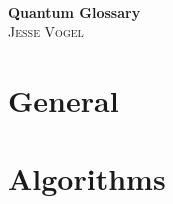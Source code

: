 \documentclass[10pt]{report}
\begin{document}
\thispagestyle{empty}

\begin{center}
    \; \\ \vspace{4cm} \textbf{\Huge Quantum Glossary}
    \\ \vspace{2cm}
    \textsc{Jesse Vogel}
\end{center}

\newpage

{
    \tableofcontents
}

\newcommand{\cat}{}

\chapter{General}
\renewcommand{\cat}{GEN}


\chapter{Algorithms}
\renewcommand{\cat}{ALG}


\end{document}
